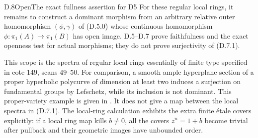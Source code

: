 \begin{statement}{D.8}{Open}{The exact fullness assertion for D5}
For these regular local rings, it remains to construct a dominant
morphism from an arbitrary relative outer homomorphism
$(\phi,\gamma)$ of (D.5.0) whose continuous homomorphism
$\phi:\pi_1(A)\to\pi_1(B)$ has open image.
D.5--D.7 prove faithfulness and the exact openness
test for actual morphisms; they do not prove surjectivity of
(D.7.1).
\end{statement}

This scope is the spectra of regular local rings essentially of
finite type specified in cote 149, scans 49--50.  For comparison,
a smooth ample hyperplane section of a proper hyperbolic polycurve
of dimension at least two induces a surjection on fundamental
groups by Lefschetz, while its inclusion is not dominant.  This
proper-variety example is given in
\cite[Example 3.13]{BIR_Carlson2026}.  It does not give a map
between the local spectra in (D.7.1).  The local-ring calculation
exhibits the extra finite \'etale covers explicitly: if a local
ring map kills $b\ne0$, all the covers $z^n=1+b$ become trivial
after pullback and their geometric images have unbounded order.
